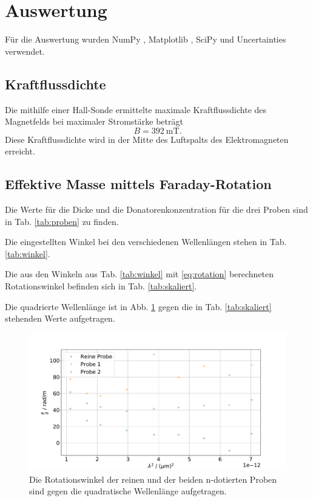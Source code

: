 \section{Auswertung}
\label{sec:Auswertung}
Für die Auswertung wurden NumPy \cite{numpy}, Matplotlib \cite{matplotlib}, SciPy \cite{scipy} und Uncertainties \cite{uncertainties} verwendet.

\subsection{Kraftflussdichte}
Die mithilfe einer Hall-Sonde ermittelte maximale Kraftflussdichte des Magnetfelds bei maximaler Stromstärke beträgt
\begin{equation*}
    B = \SI{392}{\milli\tesla}.
\end{equation*}
Diese Kraftflussdichte wird in der Mitte des Luftspalts des Elektromagneten erreicht.

\subsection{Effektive Masse mittels Faraday-Rotation}
Die Werte für die Dicke und die Donatorenkonzentration für die drei Proben sind in Tab. \ref{tab:proben} zu finden.


Die eingestellten Winkel bei den verschiedenen Wellenlängen stehen in Tab. \ref{tab:winkel}.



Die aus den Winkeln aus Tab. \ref{tab:winkel} mit \ref{eq:rotation} berechneten Rotationswinkel befinden sich in Tab. \ref{tab:skaliert}.



Die quadrierte Wellenlänge ist in Abb. \ref{fig:alle} gegen die in Tab. \ref{tab:skaliert} stehenden Werte aufgetragen.
\begin{figure}
    \centering
    \includegraphics[width=15cm]{plots/AlleProben.pdf}
    \caption{Die Rotationswinkel der reinen und der beiden n-dotierten Proben sind gegen die quadratische Wellenlänge aufgetragen.}
    \label{fig:alle}
\end{figure}

